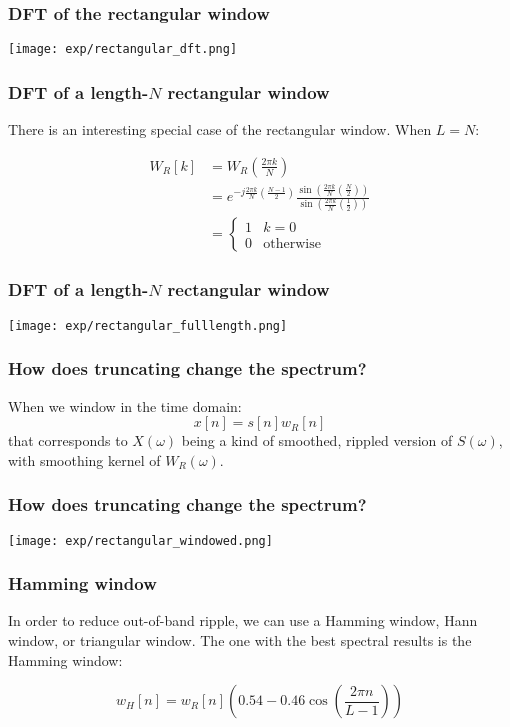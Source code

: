 \documentclass{beamer}
\begin{document}
\begin{frame}
  \frametitle{DFT of the rectangular window}

  \centerline{\texttt{[image: exp/rectangular\_dft.png]}}
\end{frame}

\begin{frame}
  \frametitle{DFT of a length-$N$ rectangular window}

  There is an interesting special case of the rectangular window.
  When $L=N$:

  \begin{align*}
    W_R[k] &= W_R\left(\frac{2\pi k}{N}\right)\\
    &= e^{-j\frac{2\pi k}{N}\left(\frac{N-1}{2}\right)}
    \frac{\sin\left(\frac{2\pi k}{N}\left(\frac{N}{2}\right)\right)}
         {\sin\left(\frac{2\pi k}{N}\left(\frac{1}{2}\right)\right)}\\
         &= \begin{cases}1 & k=0\\0&\mbox{otherwise}\end{cases}
  \end{align*}
\end{frame}

\begin{frame}
  \frametitle{DFT of a length-$N$ rectangular window}

  \centerline{\texttt{[image: exp/rectangular\_fulllength.png]}}
\end{frame}

\begin{frame}
  \frametitle{How does truncating change the spectrum?}

  When we window in the time domain:
  \begin{displaymath}
    x[n] =s[n]w_R[n]
  \end{displaymath}
  that corresponds to $X(\omega)$ being a kind of smoothed, rippled
  version of $S(\omega)$, with smoothing kernel of $W_R(\omega)$.
\end{frame}


\begin{frame}
  \frametitle{How does truncating change the spectrum?}

  \centerline{\texttt{[image: exp/rectangular\_windowed.png]}}
\end{frame}


\begin{frame}
  \frametitle{Hamming window}

  In order to reduce out-of-band ripple, we can use a Hamming window,
  Hann window, or triangular window.  The one with the best spectral
  results is the Hamming window:

  \begin{displaymath}
    w_H[n] = w_R[n]\left(0.54-0.46\cos\left(\frac{2\pi n}{L-1}\right)\right)
  \end{displaymath}
\end{frame}
\end{document}
